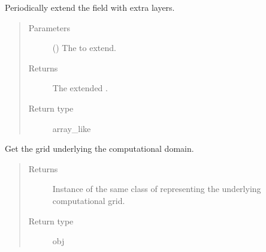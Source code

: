 \documentclass[letterpaper,10pt,english]{sphinxmanual}
\begin{document}
\begin{fulllineitems}

\begin{fulllineitems}
\label{\detokenize{api:dycore.horizontal_boundary_periodic.Periodic.from_physical_to_computational_domain}}
Periodically extend the field  with  extra layers.
\begin{quote}\begin{description}
\item[{Parameters}] \leavevmode
{} () \textendash{} The  to extend.

\item[{Returns}] \leavevmode
The extended .

\item[{Return type}] \leavevmode
array\_like

\end{description}\end{quote}

\end{fulllineitems}


\begin{fulllineitems}
\label{\detokenize{api:dycore.horizontal_boundary_periodic.Periodic.get_computational_grid}}
Get the  grid underlying the computational domain.
\begin{quote}\begin{description}
\item[{Returns}] \leavevmode
Instance of the same class of 
representing the underlying computational grid.

\item[{Return type}] \leavevmode
obj

\end{description}\end{quote}


\end{fulllineitems}
\end{fulllineitems}
\end{document}
